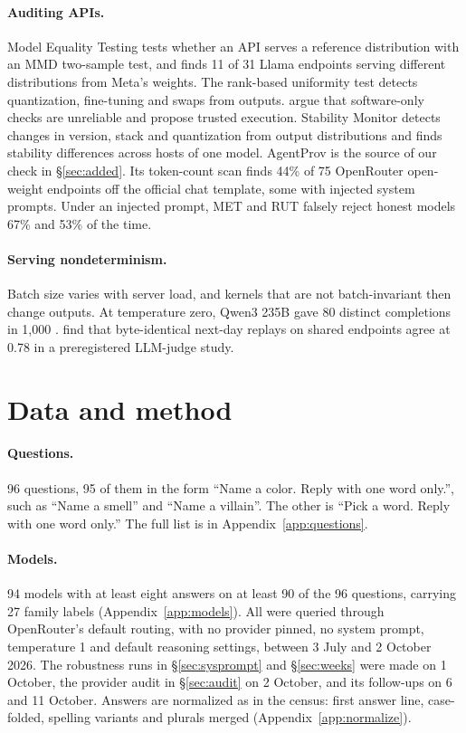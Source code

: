 \documentclass[11pt]{article}
\begin{document}
\paragraph{Auditing APIs.} Model Equality Testing \citep{gao2025met} tests whether an API serves a
reference distribution with an MMD two-sample test, and finds 11 of 31 Llama endpoints serving
different distributions from Meta's weights. The rank-based uniformity test \citep{zhu2025rut}
detects quantization, fine-tuning and swaps from outputs. \citet{cai2025payfor} argue that
software-only checks are unreliable and propose trusted execution. Stability Monitor
\citep{leshin2026stability} detects changes in version, stack and quantization from output
distributions and finds stability differences across hosts of one model. AgentProv
\citep{wang2026agentprov} is the source of our check in \S\ref{sec:added}. Its token-count scan
finds 44\% of 75 OpenRouter open-weight endpoints off the official chat template, some with
injected system prompts. Under an injected prompt, MET and RUT falsely reject honest models 67\%
and 53\% of the time.

\paragraph{Serving nondeterminism.} Batch size varies with server load, and kernels that are not
batch-invariant then change outputs. At temperature zero, Qwen3 235B gave 80 distinct completions
in 1,000 \citep{he2025nondeterminism}. \citet{zhu2026unstable} find that byte-identical next-day
replays on shared endpoints agree at 0.78 in a preregistered LLM-judge study.

\section{Data and method}
\label{sec:method}

\paragraph{Questions.} 96 questions, 95 of them in the form ``Name a color. Reply with one word
only.'', such as ``Name a smell'' and ``Name a villain''. The other is ``Pick a word. Reply with
one word only.'' The full list is in Appendix~\ref{app:questions}.

\paragraph{Models.} 94 models with at least eight answers on at least 90 of the 96 questions,
carrying 27 family labels (Appendix~\ref{app:models}). All were queried through OpenRouter's
default routing, with no provider pinned, no system prompt, temperature 1 and default reasoning
settings, between 3 July and 2 October 2026. The robustness runs in \S\ref{sec:sysprompt} and \S\ref{sec:weeks} were made on 1 October, the provider audit in \S\ref{sec:audit} on 2 October, and its follow-ups on 6 and 11 October. Answers are normalized as in the census: first answer line, case-folded, spelling variants and plurals merged (Appendix~\ref{app:normalize}).
\end{document}
